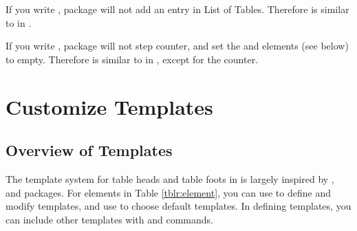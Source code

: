 \documentclass[oneside]{book}
\begin{document}
If you write ,  package will not add an entry in List of Tables.
Therefore  is similar to  in .

If you write ,  package will not step  counter,
and set the  and  elements (see below) to empty.
Therefore  is similar to 
in , except for the counter.

\section{Customize Templates}

\subsection{Overview of Templates}

The template system for table heads and table foots in  is largely inspired
by ,  and  packages. For elements in Table \ref{tblr:element},
you can use \CC{\DeclareTblrTemplate} to define and modify templates,
and use \CC{\SetTblrTemplate} to choose default templates. In defining templates,
you can include other templates with \CC{\UseTblrTemplate} and \CC{\ExpTblrTemplate} commands.
\end{document}
